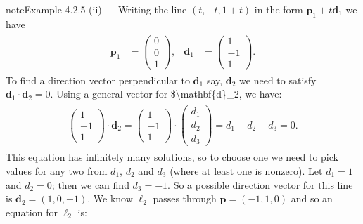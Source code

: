 \documentclass[letterpaper,10pt,english]{jupyterBook}
\begin{document}
\begin{sphinxadmonition}{note}{Example 4.2.5}
\sphinxAtStartPar
(ii)   Writing the line \((t,-t,1+t)\) in the form \(\mathbf{p}_1 + t \mathbf{d}_1\) we have
\begin{equation*}
\begin{split} \begin{align*}
    \mathbf{p}_1 &= \begin{pmatrix} 0 \\ 0 \\ 1 \end{pmatrix}, &
    \mathbf{d}_1 &= \begin{pmatrix} 1 \\ -1 \\ 1 \end{pmatrix}.
\end{align*} \end{split}
\end{equation*}
\sphinxAtStartPar
To find a direction vector perpendicular to \(\mathbf{d}_1\) \sphinxhyphen{} say, \(\mathbf{d}_2\) \sphinxhyphen{} we need to satisfy \(\mathbf{d}_1 \cdot \mathbf{d}_2 = 0\). Using a general vector for \$\textbackslash{}mathbf\{d\}\_2, we have:
\begin{equation*}
\begin{split} \begin{align*}
    \begin{pmatrix} 1 \\ -1 \\ 1 \end{pmatrix}  \cdot \mathbf{d}_2 = 
    \begin{pmatrix} 1 \\ -1 \\ 1 \end{pmatrix} \cdot 
    \begin{pmatrix} d_1 \\ d_2 \\ d_3 \end{pmatrix} = d_1 - d_2 + d_3 = 0.
\end{align*} \end{split}
\end{equation*}
\sphinxAtStartPar
This equation has infinitely many solutions, so to choose one we need to pick values for any two from \(d_1\), \(d_2\) and \(d_3\) (where at least one is non\sphinxhyphen{}zero). Let \(d_1 = 1\) and \(d_2 = 0\); then we can find \(d_3 = -1\). So a possible direction vector for this line is \(\mathbf{d}_2 = (1, 0, -1)\). We know \(\ell_2\) passes through \(\mathbf{p} = (-1, 1, 0)\) and so an equation for \(\ell_2\) is:
\begin{equation*}

\end{equation*}
\end{sphinxadmonition}
\end{document}
